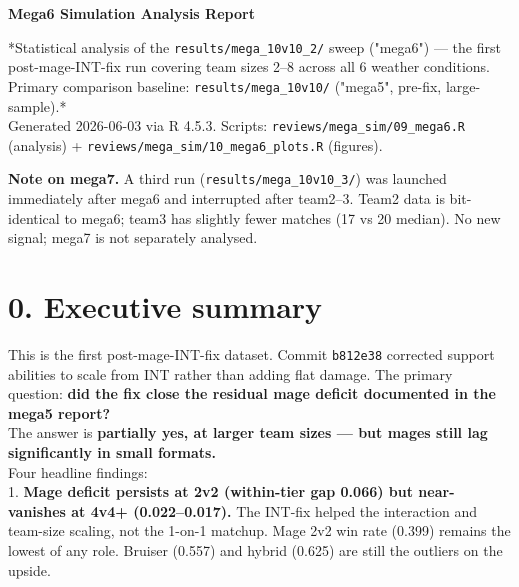 \documentclass[10pt]{article}
\begin{document}
\begin{center}{\LARGE\bfseries Mega6 Simulation Analysis Report}\end{center}\vspace{6pt}

*Statistical analysis of the \texttt{results/\allowbreak{}mega\_\allowbreak{}10v10\_\allowbreak{}2/\allowbreak{}} sweep ("mega6") --- the first post-mage-INT-fix run covering team sizes 2--8 across all 6 weather conditions. Primary comparison baseline: \texttt{results/\allowbreak{}mega\_\allowbreak{}10v10/\allowbreak{}} ("mega5", pre-fix, large-sample).*\\

Generated 2026-06-03 via R 4.5.3. Scripts: \texttt{reviews/\allowbreak{}mega\_\allowbreak{}sim/\allowbreak{}09\_\allowbreak{}mega6.\allowbreak{}R} (analysis) + \texttt{reviews/\allowbreak{}mega\_\allowbreak{}sim/\allowbreak{}10\_\allowbreak{}mega6\_\allowbreak{}plots.\allowbreak{}R} (figures).\\

\begin{quotebox}
\textbf{Note on mega7.} A third run (\texttt{results/\allowbreak{}mega\_\allowbreak{}10v10\_\allowbreak{}3/\allowbreak{}}) was launched immediately after mega6 and interrupted after team2--3. Team2 data is bit-identical to mega6; team3 has slightly fewer matches (17 vs 20 median). No new signal; mega7 is not separately analysed.
\end{quotebox}


\section*{0. Executive summary}

This is the first post-mage-INT-fix dataset. Commit \texttt{b812e38} corrected support abilities to scale from INT rather than adding flat damage. The primary question: \textbf{did the fix close the residual mage deficit documented in the mega5 report?}\\

The answer is \textbf{partially yes, at larger team sizes --- but mages still lag significantly in small formats.}\\

Four headline findings:\\

1. \textbf{Mage deficit persists at 2v2 (within-tier gap 0.066) but near-vanishes at 4v4+ (0.022--0.017).} The INT-fix helped the interaction and team-size scaling, not the 1-on-1 matchup. Mage 2v2 win rate (0.399) remains the lowest of any role. Bruiser (0.557) and hybrid (0.625) are still the outliers on the upside.\\
\end{document}
